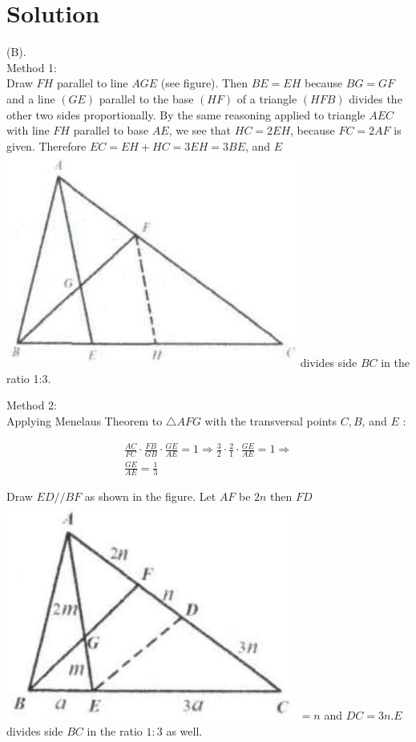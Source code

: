 \documentclass{article}
\begin{document}
\section*{Solution}
(B).\\
Method 1:\\
Draw \(F H\) parallel to line \(A G E\) (see figure). Then \(B E=E H\) because \(B G=G F\) and a line \((G E)\) parallel to the base \((H F)\) of a triangle \((H F B)\) divides the other two sides proportionally. By the same reasoning applied to triangle \(A E C\) with line \(F H\) parallel to base \(A E\), we see that \(H C=2 E H\), because \(F C=2 A F\) is given. Therefore \(E C=E H+H C=3 E H=3 B E\), and \(E\)\\
\includegraphics[width=\textwidth]{images/132.jpg} divides side \(B C\) in the ratio 1:3.

Method 2:\\
Applying Menelaus Theorem to \(\triangle A F G\) with the transversal points \(C, B\), and \(E\) :

\[
\begin{gathered}
\frac{A C}{F C} \cdot \frac{F B}{G B} \cdot \frac{G E}{A E}=1 \Rightarrow \frac{3}{2} \cdot \frac{2}{1} \cdot \frac{G E}{A E}=1 \Rightarrow \\
\frac{G E}{A E}=\frac{1}{3}
\end{gathered}
\]

Draw \(E D / / B F\) as shown in the figure. Let \(A F\) be \(2 n\) then \(F D\)\\
\includegraphics[width=\textwidth]{images/132(3).jpg} \(=n\) and \(D C=3 n . E\) divides side \(B C\) in the ratio \(1: 3\) as well.
\end{document}
